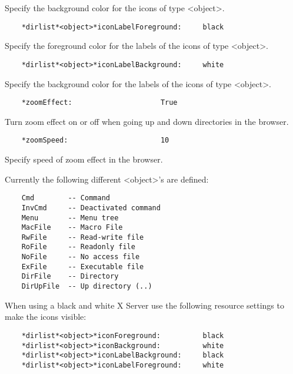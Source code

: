 \documentclass[11pt]{cernman}
\begin{document}
   Specify the background color for the icons of type <object>.

\begin{verbatim}
    *dirlist*<object>*iconLabelForeground:     black
\end{verbatim}

   Specify the foreground color for the labels of the icons of type <object>.

\begin{verbatim}
    *dirlist*<object>*iconLabelBackground:     white
\end{verbatim}

   Specify the background color for the labels of the icons of type <object>.

\begin{verbatim}
    *zoomEffect:                     True
\end{verbatim}

   Turn zoom effect on or off when going up and down directories in the
   browser.

\begin{verbatim}
    *zoomSpeed:                      10
\end{verbatim}

   Specify speed of zoom effect in the browser.

   Currently the following different <object>'s are defined:

\begin{verbatim}
    Cmd        -- Command
    InvCmd     -- Deactivated command
    Menu       -- Menu tree
    MacFile    -- Macro File
    RwFile     -- Read-write file
    RoFile     -- Readonly file
    NoFile     -- No access file
    ExFile     -- Executable file
    DirFile    -- Directory
    DirUpFile  -- Up directory (..)
\end{verbatim}

   When using a black and white X Server use the following resource settings
   to make the icons visible:

\begin{verbatim}
    *dirlist*<object>*iconForeground:          black
    *dirlist*<object>*iconBackground:          white
    *dirlist*<object>*iconLabelBackground:     black
    *dirlist*<object>*iconLabelForeground:     white
\end{verbatim}
\end{document}
